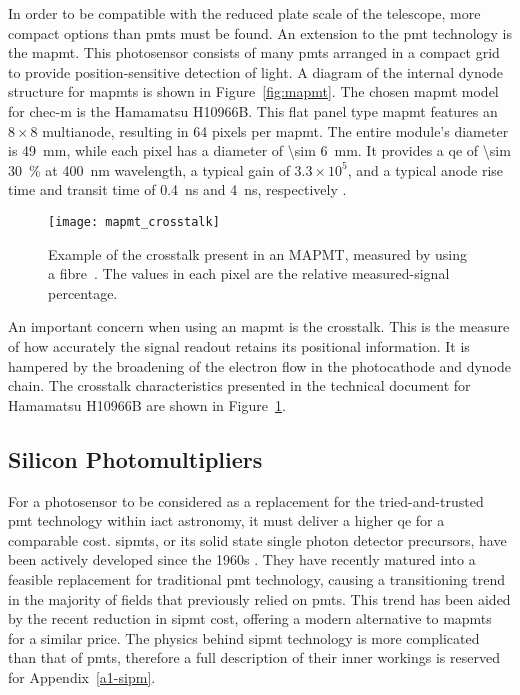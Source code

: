In order to be compatible with the reduced plate scale of the telescope, more compact options than \glspl{pmt} must be found. An extension to the \gls{pmt} technology is the \gls{mapmt}. This photosensor consists of many \glspl{pmt} arranged in a compact grid to provide position-sensitive detection of light. A diagram of the internal dynode structure for \glspl{mapmt} is shown in Figure~\ref{fig:mapmt}. The chosen \gls{mapmt} model for \gls{chec-m} is the Hamamatsu H10966B. This flat panel type \gls{mapmt} features an $8 \times 8$ multianode, resulting in 64 pixels per \gls{mapmt}. The entire module's diameter is \SI{49}{mm}, while each pixel has a diameter of \SI{\sim 6}{mm}. It provides a \gls{qe} of \SI{\sim 30}{\percent} at \SI{400}{nm} wavelength, a typical gain of $3.3 \times 10^5$, and a typical anode rise time and transit time of \SI{0.4}{ns} and \SI{4}{ns}, respectively \cite{Hamamatsu2011}. 

\begin{figure}
	\centering
    \texttt{[image: mapmt\_crosstalk]} 
	\caption[Multi-Anode Photomultiplier Tube crosstalk.]{Example of the crosstalk present in an MAPMT, measured by using a fibre~\cite{Hamamatsu2011}. The values in each pixel are the relative measured-signal percentage.}
	\label{fig:mapmt_crosstalk}
\end{figure}

An important concern when using an \gls{mapmt} is the crosstalk. This is the measure of how accurately the signal readout retains its positional information. It is hampered by the broadening of the electron flow in the photocathode and dynode chain. The crosstalk characteristics presented in the technical document for Hamamatsu H10966B are shown in Figure~\ref{fig:mapmt_crosstalk}.

\subsection{Silicon Photomultipliers}

For a photosensor to be considered as a replacement for the tried-and-trusted \gls{pmt} technology within \gls{iact} astronomy, it must deliver a higher \gls{qe} for a comparable cost. \glspl{sipmt}, or its solid state single photon detector precursors, have been actively developed since the 1960s \cite{Renker2006}. They have recently matured into a feasible replacement for traditional \gls{pmt} technology, causing a transitioning trend in the majority of fields that previously relied on \glspl{pmt}. This trend has been aided by the recent reduction in \gls{sipmt} cost, offering a modern alternative to \glspl{mapmt} for a similar price. The physics behind \gls{sipmt} technology is more complicated than that of \glspl{pmt}, therefore a full description of their inner workings is reserved for Appendix~\ref{a1-sipm}.

